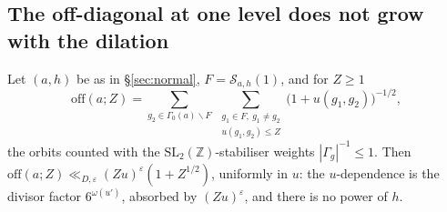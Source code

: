 \documentclass[11pt,a4paper]{article}
\newcommand{\Z}{\mathbb{Z}}\newcommand{\R}{\mathbb{R}}\newcommand{\Off}{\mathrm{Off}}\newcommand{\e}{\mathrm{e}}
\begin{document}
\subsection{The off-diagonal at one level does not grow with the dilation}
\begin{lemma}\label{lem:Aoff}
Let $(a,h)$ be as in \S\ref{sec:normal}, $F=\mathcal S_{a,h}(1)$, and for $Z\ge1$
\[
\mathrm{off}(a;Z)=\sum_{g_2\in\Gamma_0(a)\backslash F}\ \sum_{\substack{g_1\in F,\ g_1\ne g_2\\ u(g_1,g_2)\le Z}}\bigl(1+u(g_1,g_2)\bigr)^{-1/2},
\]
the orbits counted with the $\mathrm{SL}_2(\Z)$-stabiliser weights $|\Gamma_g|^{-1}\le1$. Then $\mathrm{off}(a;Z)\ll_{D,\varepsilon}(Zu)^{\varepsilon}(1+Z^{1/2})$, uniformly in
$u$: the $u$-dependence is the divisor factor $6^{\omega(u')}$, absorbed by $(Zu)^\varepsilon$, and there is no power of $h$.
\end{lemma}
\end{document}
